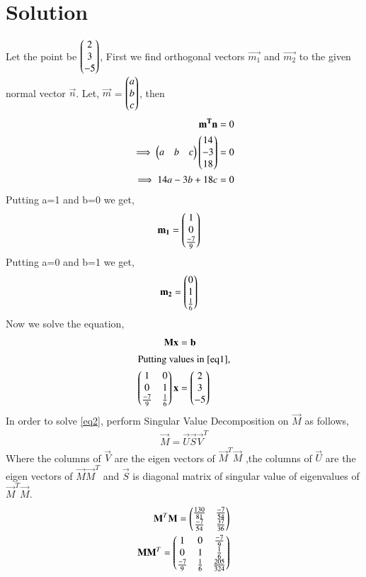 \documentclass[journal,12pt,twocolumn]{IEEEtran}
\begin{document}
 \section{\textbf{Solution}}
 Let the point be $\begin{pmatrix}2\\3\\-5\end{pmatrix}$,
First we find orthogonal vectors $\vec{m_1}$ and $\vec{m_2}$ to the given normal vector $\vec{n}$. Let, $\vec{m}$ = $\begin{pmatrix}a\\b\\c\end{pmatrix}$, then
\begin{align}
\mathbf{m^T}\mathbf{n} &= 0\\
\implies\begin{pmatrix}a&b&c\end{pmatrix}\begin{pmatrix}14\\-3\\18\end{pmatrix} &= 0\\
\implies 14a-3b+18c &= 0
\end{align}
Putting a=1 and b=0 we get,
\begin{align}
\mathbf{m_1} &= \begin{pmatrix}1\\0\\\frac{-7}{9}\end{pmatrix}\end{align}
Putting a=0 and b=1 we get,
\begin{align}
\mathbf{m_2} &= \begin{pmatrix}0\\1\\\frac{1}{6}\end{pmatrix}
\end{align}
Now we solve the equation,
\begin{align}
\mathbf{M}\mathbf{x} &= \mathbf{b}\label{eq1}\\
\intertext{Putting values in \eqref{eq1},}
\begin{pmatrix}1&0\\0&1\\\frac{-7}{9}&\frac{1}{6}\end{pmatrix}\mathbf{x} &= \begin{pmatrix}2\\3\\-5\end{pmatrix}\label{eq2}
\end{align}
In order to solve \eqref{eq2},  perform Singular Value Decomposition on $\vec{M}$ as follows,
\begin{align}
\vec{M}=\vec{U}\vec{S}\vec{V}^T\label{eq100}
\end{align}
Where the columns of $\vec{V}$ are the eigen vectors of $\vec{M}^T\vec{M}$ ,the columns of $\vec{U}$ are the eigen vectors of $\vec{M}\vec{M}^T$ and $\vec{S}$ is diagonal matrix of singular value of eigenvalues of $\vec{M}^T\vec{M}$.
\begin{align}
\mathbf{M}^T\mathbf{M}=\begin{pmatrix}\frac{130}{81}&\frac{-7}{54}\\\frac{-7}{54}&\frac{37}{36}\end{pmatrix}\label{eqMTM}\\
\mathbf{M}\mathbf{M}^T=\begin{pmatrix}1&0&\frac{-7}{9}\\0&1&\frac{1}{6}\\\frac{-7}{9}&\frac{1}{6}&\frac{205}{324}\end{pmatrix}
\end{align}
\end{document}
